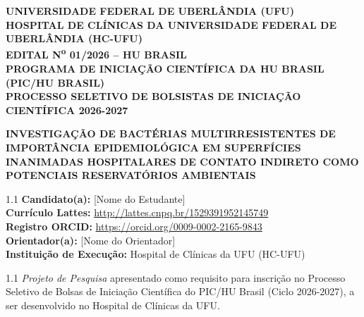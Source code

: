 \documentclass[12pt,a4paper]{article}
\begin{document}
\begin{titlepage}
    \begin{center}
        \textbf{UNIVERSIDADE FEDERAL DE UBERLÂNDIA (UFU)}\\
        \textbf{HOSPITAL DE CLÍNICAS DA UNIVERSIDADE FEDERAL DE UBERLÂNDIA (HC-UFU)}\\
        \textbf{EDITAL N\textsuperscript{o} 01/2026 -- HU BRASIL}\\
        \textbf{PROGRAMA DE INICIAÇÃO CIENTÍFICA DA HU BRASIL (PIC/HU BRASIL)}\\
        \textbf{PROCESSO SELETIVO DE BOLSISTAS DE INICIAÇÃO CIENTÍFICA 2026-2027}
        
        \vspace{2.5cm}
        
        \Large\textbf{INVESTIGAÇÃO DE BACTÉRIAS MULTIRRESISTENTES DE IMPORTÂNCIA EPIDEMIOLÓGICA EM SUPERFÍCIES INANIMADAS HOSPITALARES DE CONTATO INDIRETO COMO POTENCIAIS RESERVATÓRIOS AMBIENTAIS}
        
        \vspace{2.5cm}
        
        \begin{flushleft}
            \begin{spacing}{1.1}
                \textbf{Candidato(a):} [Nome do Estudante] \\
                \textbf{Currículo Lattes:} \url{http://lattes.cnpq.br/1529391952145749} \\
                \textbf{Registro ORCID:} \url{https://orcid.org/0009-0002-2165-9843} \\
                \textbf{Orientador(a):} [Nome do Orientador] \\
                \textbf{Instituição de Execução:} Hospital de Clínicas da UFU (HC-UFU)
            \end{spacing}
        \end{flushleft}
        
        \vspace{1.5cm}
        
        \begin{flushright}
            \begin{minipage}{9.5cm}
                \begin{spacing}{1.1}
                    \textit{Projeto de Pesquisa} apresentado como requisito para inscrição no Processo Seletivo de Bolsas de Iniciação Científica do PIC/HU Brasil (Ciclo 2026-2027), a ser desenvolvido no Hospital de Clínicas da UFU.\\
                    

\end{spacing}
\end{minipage}
\end{flushright}
\end{center}
\end{titlepage}
\end{document}
